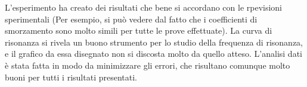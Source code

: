 L'esperimento ha creato dei risultati che bene si accordano con le rpevisioni sperimentali (Per esempio, si può vedere dal fatto
 che i coefficienti di smorzamento sono molto simili per tutte le prove effettuate). La curva di risonanza si rivela un buono
 strumento per lo studio della frequenza di risonanza, e il grafico da essa disegnato non si discosta molto da quello atteso.
 L'analisi dati è stata fatta in modo da minimizzare gli errori, che risultano comunque molto buoni per tutti i risultati presentati.
 
